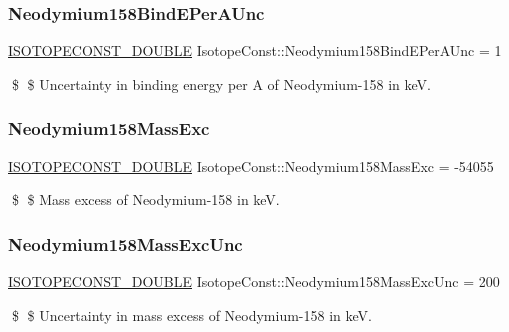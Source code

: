 \subsubsection{\texorpdfstring{Neodymium158\+Bind\+E\+Per\+A\+Unc}{Neodymium158BindEPerAUnc}}
{\footnotesize\ttfamily \mbox{\hyperlink{group___isotope_const-_macros_ga8f45a7272ce02c0b4c65c44636ed719a}{I\+S\+O\+T\+O\+P\+E\+C\+O\+N\+S\+T\+\_\+\+D\+O\+U\+B\+LE}} Isotope\+Const\+::\+Neodymium158\+Bind\+E\+Per\+A\+Unc = 1}

\$ \$ Uncertainty in binding energy per A of Neodymium-\/158 in keV. \mbox{\label{group___isotope_const-_neodymium-_nd158_gae9c86eccd9f131babc60414c29d11e49}} 
\subsubsection{\texorpdfstring{Neodymium158\+Mass\+Exc}{Neodymium158MassExc}}
{\footnotesize\ttfamily \mbox{\hyperlink{group___isotope_const-_macros_ga8f45a7272ce02c0b4c65c44636ed719a}{I\+S\+O\+T\+O\+P\+E\+C\+O\+N\+S\+T\+\_\+\+D\+O\+U\+B\+LE}} Isotope\+Const\+::\+Neodymium158\+Mass\+Exc = -\/54055}

\$ \$ Mass excess of Neodymium-\/158 in keV. \mbox{\label{group___isotope_const-_neodymium-_nd158_ga2c62a0178d56870de3a2e540a2328ed3}} 
\subsubsection{\texorpdfstring{Neodymium158\+Mass\+Exc\+Unc}{Neodymium158MassExcUnc}}
{\footnotesize\ttfamily \mbox{\hyperlink{group___isotope_const-_macros_ga8f45a7272ce02c0b4c65c44636ed719a}{I\+S\+O\+T\+O\+P\+E\+C\+O\+N\+S\+T\+\_\+\+D\+O\+U\+B\+LE}} Isotope\+Const\+::\+Neodymium158\+Mass\+Exc\+Unc = 200}

\$ \$ Uncertainty in mass excess of Neodymium-\/158 in keV. \mbox{\label{group___isotope_const-_neodymium-_nd158_ga9699212b407b0a43c369529acd126d82}} 
